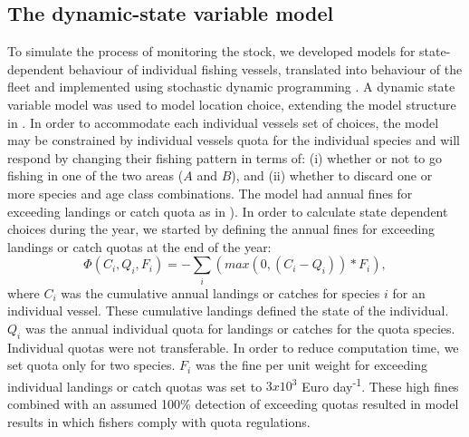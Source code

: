 \documentclass[12pt,oneline,a4paper,numbib]{ouparticle}
\numberwithin{equation}{subsection} %
\begin{document}
\subsection{The dynamic-state variable model}
\label{sec2.2}

To simulate the process of monitoring the stock, we developed models for state-dependent behaviour of individual fishing vessels, translated into behaviour of the fleet and implemented using stochastic dynamic programming \cite{Alzorriz2018, Batsleer2015, ClarkandMangel2000, Dowling2011, Houston1999, Poos2010}. A dynamic state variable model \cite{Houston1999, ClarkandMangel2000} was used to model location choice, extending the model structure in \cite{Batsleer2015}. In order to accommodate each individual vessels set of choices, the model may be constrained by individual vessels quota for the individual species and will respond by changing their fishing pattern in terms of: (i) whether or not to go fishing in one of the two areas ($A$ and $B$), and (ii) whether to discard one or more species and age class combinations. The model had annual fines for exceeding landings or catch quota as in \cite{Alzorriz2018}). In order to calculate state dependent choices during the year, we started by defining the annual fines for exceeding landings or catch quotas at the end of the year:
\begin{equation}
\Phi (C_i, Q_i, F_i)= -\sum_i (max( 0, (C_i - Q_i))* F_i),
\end{equation}
where $C_i$ was the cumulative annual landings or catches for species $i$ for an individual vessel. These cumulative landings defined the state of the individual. $Q_i$ was the annual individual quota for landings or catches for the quota species. Individual quotas were not transferable. In order to reduce computation time, we set quota only for two species. $F_i$ was the fine per unit weight for exceeding individual landings or catch quotas was set to $3 x 10^3$ Euro day\textsuperscript{-1}. These high fines combined with an assumed 100\% detection of exceeding quotas resulted in model results in which fishers comply with quota regulations.
\end{document}
